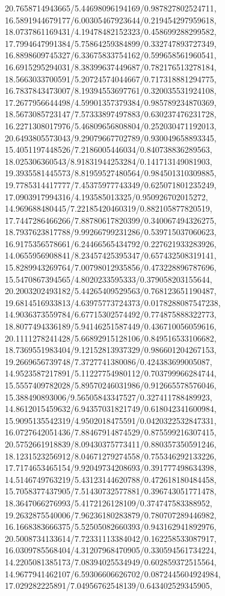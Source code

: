 {20.7658714943665/5.44698096194169/0.987827802524711,
16.5891944679177/6.00305467923644/0.219454297959618,
18.0737861169431/4.19478482152323/0.458699288299582,
17.7994647991384/5.75864259384899/0.332747893727349,
16.8898609745327/6.33675833754162/0.599658561960541,
16.6915295294031/8.38399637449687/0.782176513278184,
18.5663033700591/5.20724574044667/0.717318881294775,
16.7837843473007/8.19394553697761/0.320035531924108,
17.2677956644498/4.59901357379384/0.985789234870369,
18.5673085723147/7.57333897497883/0.630237476231728,
16.2271308017976/5.46809656808804/0.252030471192013,
20.6493805573043/9.29079667702789/0.930049658893345,
15.4051197448526/7.2186005446034/0.840738836289563,
18.025306360543/8.91831944253284/0.141713149081903,
19.3935581445573/8.81959527480564/0.984501310309885,
19.7785314417777/7.45375977743349/0.625071801235249,
17.0903917994316/4.193585013325/0.950926702015272,
14.969688480445/7.22185420460319/0.882105877820519,
17.7447286466266/7.88780617820399/0.340067494326275,
18.7937623817788/9.99266799231286/0.539715037060623,
16.9175356578661/6.24466565434792/0.227621933283926,
14.0655956908841/8.23457425395347/0.657432508319141,
15.8289943269764/7.00798012935856/0.473228896787696,
15.5470867394565/4.8020233595333/0.379058203155644,
20.2003202493182/5.44265409529563/0.768123651190487,
19.6814516933813/4.63975773724373/0.0178288087547238,
14.9036373559784/6.67715302574492/0.774875888322773,
18.8077494336189/5.94146251587449/0.436710056059616,
20.1111278241428/5.66892915128106/0.849516533106682,
18.7369551983404/9.12152813937329/0.986601204267153,
19.2669656739748/7.3727741380086/0.424383699005087,
14.9523587217891/5.11227754980112/0.703799966284744,
15.5557409782028/5.89570246031986/0.912665578576046,
15.388490893006/9.56505843347527/0.327411788489923,
14.8612015459632/6.94357031821749/0.618042341600984,
15.9095135542319/4.9502018475591/0.0420322532847331,
16.0727642051436/7.88467914874529/0.875599216307415,
20.5752661918839/8.09430375773411/0.880357350591246,
18.1231523256912/8.04671279274558/0.755346292133226,
17.7174653465154/9.92049734208693/0.391777498634398,
14.5146749763219/5.43123144620788/0.472618180484458,
15.7058377437905/7.51430732577881/0.396743051771478,
18.3647066276993/5.4172126128109/0.374747583388952,
19.2632875540006/7.96236180283879/0.780707289446982,
16.1668383666375/5.52505082660393/0.943162941892976,
20.5008734133614/7.72331113384042/0.162258533087917,
16.0309785568404/4.31207968470905/0.330594561734224,
14.2205081385173/7.08394025534949/0.602859372515564,
14.9677941462107/6.59306606626702/0.0872445604924984,
17.029282225891/7.04956762548139/0.643402529345905,
}
